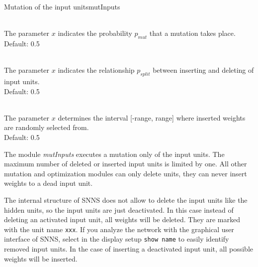 \begin{moduledoc}{Mutation of the input units}{mutInputs}
  \item[\KeyWord{probMutInputs} \optParam{ x } ]~\\
    The parameter $x$ indicates the probability $p_{mut}$ that  
    a mutation takes place.\\
    Default: 0.5
  \item[\KeyWord{probMutInputsSplit} \optParam{ x } ]~\\
    The parameter $x$ indicates 
    the relationship $p_{split}$ between inserting and deleting of 
    input units.\\
    Default: 0.5 
  \item[\KeyWord{initRange} \optParam{ x } ]~\\
    The parameter $x$ determines the interval  [-range, range] where
    inserted weights are randomly selected from.\\
    Default: 0.5
\end{moduledoc}
The module {\it mutInputs} executes a mutation only of the input units.
The maximum number of deleted or inserted input units is limited by one.
All other mutation and optimization modules can only delete units, they can
never insert weights to a dead input unit.

The internal structure of SNNS does not allow to delete the input units like
the hidden units, so the input units are just deactivated.
In this case instead of deleting an activated input unit, all weights will be deleted.
They are marked with the unit name \verb+xxx+. 
If you analyze the network with the graphical user interface of SNNS,
select in the display setup \verb+show name+ to easily identify removed input units.
In the case of inserting a deactivated input unit, all possible weights will be inserted.




